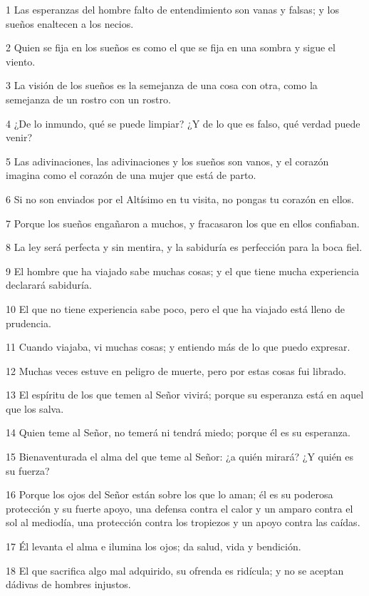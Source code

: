 \par 1 Las esperanzas del hombre falto de entendimiento son vanas y falsas; y los sueños enaltecen a los necios.
\par 2 Quien se fija en los sueños es como el que se fija en una sombra y sigue el viento.
\par 3 La visión de los sueños es la semejanza de una cosa con otra, como la semejanza de un rostro con un rostro.
\par 4 ¿De lo inmundo, qué se puede limpiar? ¿Y de lo que es falso, qué verdad puede venir?
\par 5 Las adivinaciones, las adivinaciones y los sueños son vanos, y el corazón imagina como el corazón de una mujer que está de parto.
\par 6 Si no son enviados por el Altísimo en tu visita, no pongas tu corazón en ellos.
\par 7 Porque los sueños engañaron a muchos, y fracasaron los que en ellos confiaban.
\par 8 La ley será perfecta y sin mentira, y la sabiduría es perfección para la boca fiel.
\par 9 El hombre que ha viajado sabe muchas cosas; y el que tiene mucha experiencia declarará sabiduría.
\par 10 El que no tiene experiencia sabe poco, pero el que ha viajado está lleno de prudencia.
\par 11 Cuando viajaba, vi muchas cosas; y entiendo más de lo que puedo expresar.
\par 12 Muchas veces estuve en peligro de muerte, pero por estas cosas fui librado.
\par 13 El espíritu de los que temen al Señor vivirá; porque su esperanza está en aquel que los salva.
\par 14 Quien teme al Señor, no temerá ni tendrá miedo; porque él es su esperanza.
\par 15 Bienaventurada el alma del que teme al Señor: ¿a quién mirará? ¿Y quién es su fuerza?
\par 16 Porque los ojos del Señor están sobre los que lo aman; él es su poderosa protección y su fuerte apoyo, una defensa contra el calor y un amparo contra el sol al mediodía, una protección contra los tropiezos y un apoyo contra las caídas.
\par 17 Él levanta el alma e ilumina los ojos; da salud, vida y bendición.
\par 18 El que sacrifica algo mal adquirido, su ofrenda es ridícula; y no se aceptan dádivas de hombres injustos.
